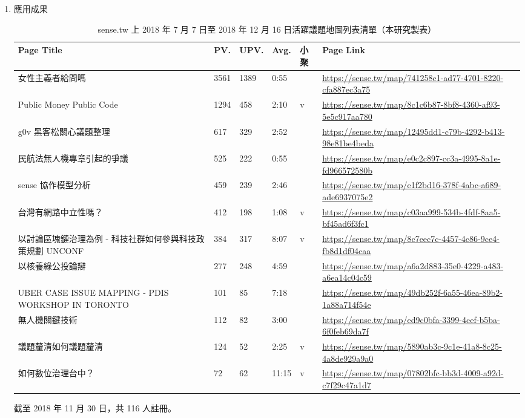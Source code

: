 \documentclass[12pt,a4paper]{article}
\begin{document}
\begin{enumerate}
\item 應用成果
\label{sec:org9db657d}
\begin{table}[htbp]
\caption{\label{tab:orge948502}
sense.tw 上 2018 年 7 月 7 日至 2018 年 12 月 16 日活躍議題地圖列表清單（本研究製表）}
\centering
\setlength{\tabcolsep}{3pt} 
\begin{tabular}{p{130pt}llllp{204pt}}
\toprule
Page Title & PV. & UPV. & Avg. & 小聚 & Page Link\\
\midrule
女性主義者給問嗎 & 3561 & 1389 & 0:55 &  & \url{https://sense.tw/map/741258c1-ad77-4701-8220-cfa887ec3a75}\\
Public Money Public Code & 1294 & 458 & 2:10 & v & \url{https://sense.tw/map/8c1c6b87-8bf8-4360-af93-5e5c917aa780}\\
g0v 黑客松關心議題整理 & 617 & 329 & 2:52 &  & \url{https://sense.tw/map/12495dd1-c79b-4292-b413-98e81be4beda}\\
民航法無人機專章引起的爭議 & 525 & 222 & 0:55 &  & \url{https://sense.tw/map/e0c2c897-cc3a-4995-8a1e-fd966572580b}\\
sense 協作模型分析 & 459 & 239 & 2:46 &  & \url{https://sense.tw/map/e1f2bd16-378f-4abc-a689-ade6937075e2}\\
台灣有網路中立性嗎？ & 412 & 198 & 1:08 & v & \url{https://sense.tw/map/c03aa999-534b-4fdf-8aa5-bf45ad6f3fc1}\\
以討論區塊鏈治理為例 - 科技社群如何參與科技政策規劃 UNCONF & 384 & 317 & 8:07 & v & \url{https://sense.tw/map/8c7eec7c-4457-4c86-9ce4-fb8d1df04caa}\\
以核養綠公投論辯 & 277 & 248 & 4:59 &  & \url{https://sense.tw/map/a6a2d883-35e0-4229-a483-a6ea14c04c59}\\
UBER CASE ISSUE MAPPING - PDIS WORKSHOP IN TORONTO & 101 & 85 & 7:18 &  & \url{https://sense.tw/map/49db252f-6a55-46ea-89b2-1a88a714f54e}\\
無人機關鍵技術 & 112 & 82 & 3:00 &  & \url{https://sense.tw/map/ed9c0bfa-3399-4cef-b5ba-6f0feb69da7f}\\
議題釐清如何議題釐清 & 124 & 52 & 2:25 & v & \url{https://sense.tw/map/5890ab3c-9c1e-41a8-8c25-4a8de929a9a0}\\
如何數位治理台中？ & 72 & 62 & 11:15 & v & \url{https://sense.tw/map/07802bfc-bb3d-4009-a92d-c7f29c47a1d7}\\
\bottomrule
\end{tabular}
\end{table}

截至 2018 年 11 月 30 日，共 116 人註冊。


\end{enumerate}
\end{document}
